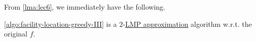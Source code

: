 From \autoref{lma:lec6}, we immediately have the following.

\begin{theorem}
	\autoref{algo:facility-location-greedy-III} is a \(2\)-\hyperref[def:LMP]{LMP approximation} algorithm w.r.t. the original \(f\).
\end{theorem}